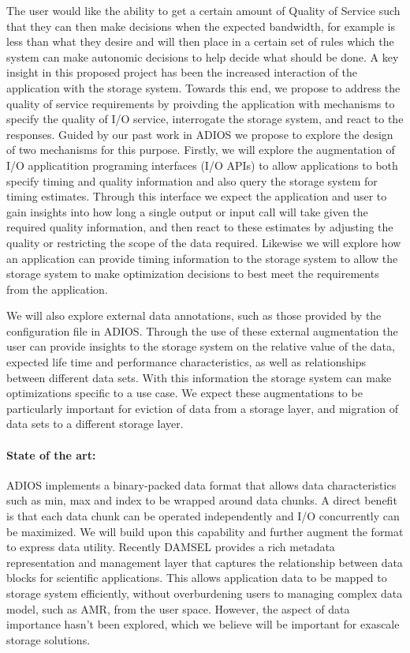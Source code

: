The user would like the ability to get a certain amount of Quality of Service 
such that they can then make decisions when the expected bandwidth, 
for example is less than what they desire and will then place in a certain set 
of rules which the system can make autonomic decisions to help decide what should be done.
A key insight in this proposed project has been the increased interaction of
the application with the storage system. Towards this end, we propose to
address the quality of service requirements by proivding the application
with mechanisms to specify the quality of I/O service, interrogate the
storage system, and react to the responses. Guided by our past work in
ADIOS \cite{lofstead2008flexible} we propose to explore the design of two
mechanisms for this purpose. Firstly, we will explore the augmentation of
I/O applicatition programing interfaces (I/O APIs) to allow applications to
both specify timing and quality information and also query the storage
system for timing estimates. Through this interface we expect the
application and user to gain insights into how long a single output or input
call will take given the required quality information, and then react to
these estimates by adjusting the quality or restricting the scope of the
data required. Likewise we will explore how an application can provide
timing information to the storage system to allow the storage system to make
optimization decisions to best meet the requirements from the application. 

We will also explore external data annotations, such as those
provided by the configuration file in ADIOS. Through the use of these
external augmentation the user can provide insights to the storage system on
the relative value of the data, expected life time and performance
characteristics, as well as relationships between different data sets. With
this information the storage system can make optimizations specific to a use
case. We expect these augmentations to be particularly important for
eviction of data from a storage layer, and migration of data sets to a
different storage layer. 

\paragraph{State of the art:} ADIOS implements a binary-packed data format that allows
data characteristics such as min, max and index to be wrapped around data chunks. A
direct benefit is that each data chunk can be operated independently and I/O concurrently
can be maximized. We will build upon this capability and further augment the format
to express data utility. Recently DAMSEL \cite{damsel} provides a rich metadata representation
and management layer that captures the relationship between data blocks for scientific applications.
This allows application data to be mapped to storage system efficiently, without overburdening
users to managing complex data model, such as AMR, from the user space. However, the aspect of 
data importance hasn't been explored, which we believe will be important for exascale storage solutions. 

